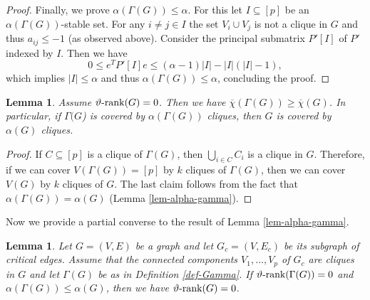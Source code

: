 \documentclass[11pt]{article}
\newcommand{\ignore}[1]{}
\newtheorem{lemma}[theorem]{Lemma}
\newcommand{\kzeroc}{\MK^{(0)}\text{-certificate}}
\numberwithin{equation}{section}
\newcommand{\MK}{{\mathcal K}}
\newcommand{\rrank}{\vartheta\text{\rm -rank}}
\begin{document}
\begin{proof}
\ignore{
\textcolor{blue}{is a $\kzeroc$ for $M_{\Gamma(G)}$. Indeed, it is positive semidefinite and $|a_{ij}|\le \alpha -1 \leq \alpha(\Gamma(G))-1$ for all $i,j\in [p]$. It suffices to check that $a_{ij}\le -1$ if $\{i,j\}$ is not an edge of $\Gamma(G)$.  In this case,  $V_i\cup V_j$ is not an clique in $G$ and thus  there exist vertices $u\in V_i$ and $v \in V_j$ such that $\{u,v\}$ is not an edge in $G$, which implies  $a_{ij}=P_{uv} \le (M_G)_{uv}=-1$. Therefore, $P'$ is a $\kzeroc$ for $M_{\Gamma(G)}$, which shows that $\Gamma(G)$ has $\rrank$ 0.}\ignore{Therefore, we have  $P' \leq \alpha(A_{\Gamma(G)}+I)-J \leq \alpha(\Gamma(G))(A_{\Gamma(G)}+I)-J =M_{\Gamma(G)}$, where we use the fact that $\alpha\le \alpha(\Gamma(G))$. This shows that $\Gamma(G)$ has $\rrank$ 0.}
}

Finally, we prove $\alpha(\Gamma(G))\leq \alpha$.
 For this let $I\subseteq [p]$ be an $\alpha(\Gamma(G))$-stable set. For any $i\ne j\in I$ the set  $V_i\cup V_j$ is not a clique in $G$ and thus  $a_{ij}\leq -1$ (as observed above). Consider the principal submatrix $P'[I]$ of $P'$ indexed by $I$.
 Then we have
 $$0\le e^TP'[I]e \leq (\alpha-1)|I|-|I|(|I|-1),$$
 which implies $|I|\le \alpha$ and thus $\alpha(\Gamma(G))\le \alpha$, concluding the proof.
 \end{proof}

\begin{lemma}\label{lem-gamma_cliques}
Assume $\rrank (G)=0$. Then we have $\overline{\chi}(\Gamma(G))\geq \overline{\chi}(G)$. In particular, if $\Gamma(G$) is covered by $\alpha(\Gamma(G))$ cliques, then $G$ is covered by $\alpha(G)$ cliques.
\end{lemma}

\begin{proof}
If $C\subseteq [p]$ is a clique of $\Gamma(G)$, then $\bigcup_{i\in C} C_i$ is a clique in $G$. Therefore, if we can cover $V(\Gamma(G))=[p]$ by $k$ cliques of $\Gamma(G)$, then we can  cover $V(G)$ by $k$ cliques of $G$.
The last claim follows from the fact that $\alpha(\Gamma(G))=\alpha(G)$ (Lemma \ref{lem-alpha-gamma}).
\end{proof}

Now we  provide a partial converse to the result of Lemma \ref{lem-alpha-gamma}.

\begin{lemma}\label{lem-necessary}
Let $G=(V,E)$ be a graph and let $G_c=(V,E_c)$ be its subgraph of critical edges. Assume that the connected components  $V_1,\ldots,V_p$ of $G_c$ are cliques in  $G$ and let $\Gamma(G)$ be as in Definition \ref{def-Gamma}.  If   $\rrank(\Gamma(G))=0$ and $\alpha(\Gamma(G))\leq \alpha(G)$, then 
we have $\rrank(G)=0$.
\end{lemma}
\end{document}
